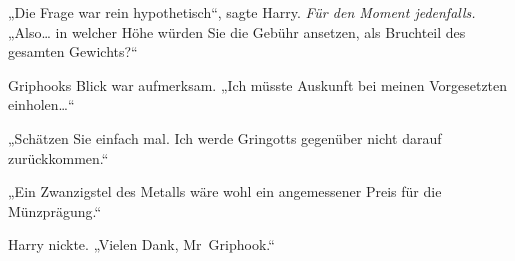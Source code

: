 „Die Frage war rein hypothetisch“, sagte Harry. \emph{Für den Moment jedenfalls.} „Also… in welcher Höhe würden Sie die Gebühr ansetzen, als Bruchteil des gesamten Gewichts?“

Griphooks Blick war aufmerksam. „Ich müsste Auskunft bei meinen Vorgesetzten einholen…“

„Schätzen Sie einfach mal. Ich werde Gringotts gegenüber nicht darauf zurückkommen.“

„Ein Zwanzigstel des Metalls wäre wohl ein angemessener Preis für die Münzprägung.“

Harry nickte. „Vielen Dank, Mr~Griphook.“

